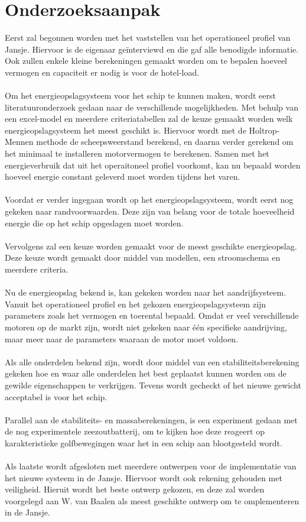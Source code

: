 \section{Onderzoeksaanpak}
Eerst zal begonnen worden met het vaststellen van het operationeel profiel van Jansje. Hiervoor is de eigenaar geïnterviewd en die gaf alle benodigde informatie. Ook zullen enkele kleine berekeningen gemaakt worden om te bepalen hoeveel vermogen en capaciteit er nodig is voor de hotel-load.
\\\\
Om het energieopslagsysteem voor het schip te kunnen maken, wordt eerst literatuuronderzoek gedaan naar de verschillende mogelijkheden. Met behulp van een excel-model en meerdere criteriatabellen zal de keuze gemaakt worden welk energieopslagsysteem het meest geschikt is. Hiervoor wordt met de Holtrop-Mennen methode de scheepsweerstand berekend, en daarna verder gerekend om het minimaal te installeren motorvermogen te berekenen. Samen met het energieverbruik dat uit het operaitoneel profiel voorkomt, kan nu bepaald worden hoeveel energie constant geleverd moet worden tijdens het varen.
\\\\
Voordat er verder ingegaan wordt op het energieopslagsysteem, wordt eerst nog gekeken naar randvoorwaarden. Deze zijn van belang voor de totale hoeveelheid energie die op het schip opgeslagen moet worden.
\\\\
Vervolgens zal een keuze worden gemaakt voor de meest geschikte energieopslag. Deze keuze wordt gemaakt door middel van modellen, een stroomschema en meerdere criteria.
\\\\
Nu de energieopslag bekend is, kan gekeken worden naar het aandrijfsysteem. Vanuit het operationeel profiel en het gekozen energieopslagsysteem zijn parameters zoals het vermogen en toerental bepaald. Omdat er veel verschillende motoren op de markt zijn, wordt niet gekeken naar één specifieke aandrijving, maar meer naar de parameters waaraan de motor moet voldoen.
\\\\
Als alle onderdelen bekend zijn, wordt door middel van een stabiliteitsberekening gekeken hoe en waar alle onderdelen het best geplaatst kunnen worden om de gewilde eigenschappen te verkrijgen. Tevens wordt gecheckt of het nieuwe gewicht acceptabel is voor het schip.
\\\\
Parallel aan de stabiliteits- en massaberekeningen, is een experiment gedaan met de nog experimentele zeezoutbatterij, om te kijken hoe deze reageert op karakteristieke golfbewegingen waar het in een schip aan blootgesteld wordt.
\\\\
Als laatste wordt afgesloten met meerdere ontwerpen voor de implementatie van het nieuwe systeem in de Jansje. Hiervoor wordt ook rekening gehouden met veiligheid. Hieruit wordt het beste ontwerp gekozen, en deze zal worden voorgelegd aan W. van Baalen als meest geschikte ontwerp om te omplementeren in de Jansje.

